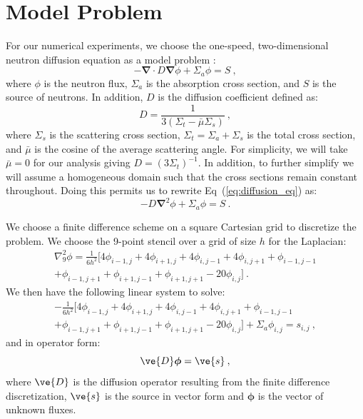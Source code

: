 \documentclass[preprint,11pt]{elsarticle}
\begin{document}
\section{Model Problem}
\label{sec:model_problem}

For our numerical experiments, we choose the one-speed,
two-dimensional neutron diffusion equation as a model problem
\cite{duderstadt_nuclear_1976}:
\begin{equation}
  -\boldsymbol{\nabla} \cdot D \boldsymbol{\nabla} \phi + \Sigma_a
  \phi = S\:,
  \label{eq:diffusion_eq}
\end{equation}
where $\phi$ is the neutron flux, $\Sigma_a$ is the absorption cross
section, and $S$ is the source of neutrons. In addition, $D$ is the
diffusion coefficient defined as:
\begin{equation}
  D = \frac{1}{3 ( \Sigma_t - \bar{\mu}\Sigma_s )}\:,
  \label{eq:diffusion_coeff}
\end{equation}
where $\Sigma_s$ is the scattering cross section, $\Sigma_t = \Sigma_a
+ \Sigma_s$ is the total cross section, and $\bar{\mu}$ is the cosine
of the average scattering angle. For simplicity, we will take
$\bar{\mu} = 0$ for our analysis giving $D=(3 \Sigma_t)^{-1}$. In
addition, to further simplify we will assume a homogeneous domain such
that the cross sections remain constant throughout. Doing this permits
us to rewrite Eq~(\ref{eq:diffusion_eq}) as:
\begin{equation}
  -D \boldsymbol{\nabla}^2 \phi + \Sigma_a \phi = S\:.
  \label{eq:diffusion_eq_simple}
\end{equation}

We choose a finite difference scheme on a square Cartesian grid to discretize
the problem. We choose the 9-point stencil over a grid of size $h$
\cite{leveque_finite_2007} for the Laplacian:
\begin{multline}
  \nabla^2_9\phi = \frac{1}{6h^2}[4 \phi_{i-1,j} + 4 \phi_{i+1,j}
    + 4 \phi_{i,j-1} + 4 \phi_{i,j+1} + \phi_{i-1,j-1}\\ +
    \phi_{i-1,j+1} + \phi_{i+1,j-1} + \phi_{i+1,j+1} - 20
    \phi_{i,j}]\:.
  \label{eq:nine_point_stencil}
\end{multline}
We then have the following linear system to solve:
\begin{multline}
  -\frac{1}{6h^2}[4 \phi_{i-1,j} + 4 \phi_{i+1,j} + 4
    \phi_{i,j-1} + 4 \phi_{i,j+1} + \phi_{i-1,j-1}\\ + \phi_{i-1,j+1}
    + \phi_{i+1,j-1} + \phi_{i+1,j+1} - 20 \phi_{i,j}] + \Sigma_a
  \phi_{i,j} = s_{i,j}\:,
  \label{eq:fd_system}
\end{multline}
and in operator form:
\begin{equation}
  \ve{D}\boldsymbol{\phi}=\ve{s}\:,
  \label{eq:operator_system}
\end{equation}
where $\ve{D}$ is the diffusion operator resulting from the finite difference
discretization, $\ve{s}$ is the source in vector form and $\boldsymbol{\phi}$
is the vector of unknown fluxes.
\end{document}
